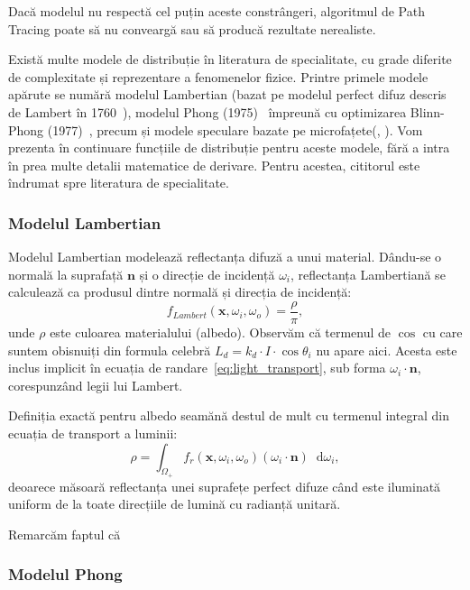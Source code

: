 \documentclass[12pt,a4paper]{report}
\newcommand*\diff{\mathop{}\!\mathrm{d}}
\numberwithin{equation}{section} %
\begin{document}
Dacă modelul nu respectă cel puțin aceste constrângeri, algoritmul de Path Tracing
poate să nu conveargă sau să producă rezultate nerealiste.

Există multe modele de distribuție în literatura de specialitate, cu grade diferite de complexitate și
reprezentare a fenomenelor fizice. Printre primele modele apărute se numără
modelul Lambertian (bazat pe modelul perfect difuz descris de Lambert în 1760~\cite{Lambert}),
modelul Phong (1975)~\cite{Phong} împreună cu optimizarea Blinn-Phong (1977)~\cite{BlinnPhong},
precum și modele speculare bazate pe microfațete(\cite{TorranceOld}, \cite{CookTorrance}).
Vom prezenta în continuare funcțiile de distribuție pentru aceste modele, fără a intra
în prea multe detalii matematice de derivare. Pentru acestea, cititorul este îndrumat
spre literatura de specialitate.

\subsubsection*{Modelul Lambertian}

Modelul Lambertian modelează reflectanța difuză a unui material. Dându-se o normală
la suprafață $\mathbf{n}$ și o direcție de incidență $\omega_i$, reflectanța Lambertiană
se calculează ca produsul dintre normală și direcția de incidență:
\begin{equation}
	f_{Lambert}(\mathbf{x}, \omega_i, \omega_o) = \frac{\rho}{\pi},
\end{equation}
unde $\rho$ este culoarea materialului (albedo). Observăm că termenul de $\cos$ cu
care suntem obisnuiți din formula celebră $L_d = k_d \cdot I \cdot \cos \theta_i$ nu apare
aici. Acesta este inclus implicit în ecuația de randare~\ref{eq:light_transport}, sub forma $\omega_i \cdot \mathbf{n}$,
corespunzând legii lui Lambert.

Definiția exactă pentru albedo
seamănă destul de mult cu termenul integral din ecuația de transport a luminii:
\begin{equation}
	\rho = \int_{\Omega_+} f_r(\mathbf{x}, \omega_i, \omega_o) (\omega_i \cdot \mathbf{n}) \diff \omega_i,
\end{equation}
deoarece măsoară reflectanța unei suprafețe perfect difuze când este iluminată
uniform de la toate direcțiile de lumină cu radianță unitară.

Remarcăm faptul că 

\subsubsection*{Modelul Phong}
\end{document}
